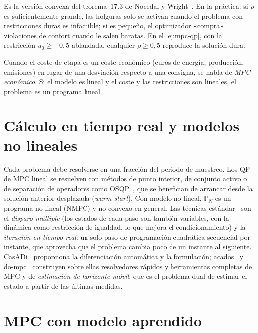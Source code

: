 Es la versión convexa del teorema~17.3 de Nocedal y Wright~\cite[§17.2]{nw}. En la práctica: si $\rho$ es suficientemente grande, las holguras solo se activan cuando el problema con restricciones duras es infactible; si es pequeño, el optimizador «compra» violaciones de confort cuando le salen baratas. En el \cref{ej:mpc-qp}, con la restricción $u_0\ge-0{,}5$ ablandada, cualquier $\rho\ge0{,}5$ reproduce la solución dura.

\begin{definicion}\label{def:empc}
Cuando el coste de etapa es un coste económico (euros de energía, producción, emisiones) en lugar de una desviación respecto a una consigna, se habla de \emph{MPC económico}. Si el modelo es lineal y el coste y las restricciones son lineales, el problema es un programa lineal.
\end{definicion}

\section{Cálculo en tiempo real y modelos no lineales}

Cada problema debe resolverse en una fracción del periodo de muestreo. Los QP de MPC lineal se resuelven con métodos de punto interior, de conjunto activo o de separación de operadores como OSQP~\cite{osqp}, que se benefician de arrancar desde la solución anterior desplazada (\emph{warm start}). Con modelo no lineal, $\mathbb P_N$ es un programa no lineal (NMPC) y no convexo en general. Las técnicas estándar~\cite[cap.~8]{rmd} son el \emph{disparo múltiple} (los estados de cada paso son también variables, con la dinámica como restricción de igualdad, lo que mejora el condicionamiento) y la \emph{iteración en tiempo real}: un solo paso de programación cuadrática secuencial por instante, que aprovecha que el problema cambia poco de un instante al siguiente. CasADi~\cite{casadi} proporciona la diferenciación automática y la formulación; acados~\cite{acados} y do-mpc~\cite{dompc} construyen sobre ellas resolvedores rápidos y herramientas completas de MPC y de \emph{estimación de horizonte móvil}, que es el problema dual de estimar el estado a partir de las últimas medidas.

\section{MPC con modelo aprendido}

